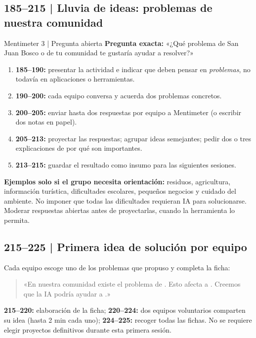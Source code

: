 \documentclass[11pt,a4paper]{article}
\begin{document}
\subsection{185--215 | Lluvia de ideas: problemas de nuestra comunidad}
\begin{actividad}{Mentimeter 3 | Pregunta abierta}
\textbf{Pregunta exacta:} «¿Qué problema de San Juan Bosco o de tu comunidad te gustaría ayudar a resolver?»
\begin{enumerate}
\item \textbf{185--190:} presentar la actividad e indicar que deben pensar en \emph{problemas}, no todavía en aplicaciones o herramientas.
\item \textbf{190--200:} cada equipo conversa y acuerda dos problemas concretos.
\item \textbf{200--205:} enviar hasta dos respuestas por equipo a Mentimeter (o escribir dos notas en papel).
\item \textbf{205--213:} proyectar las respuestas; agrupar ideas semejantes; pedir dos o tres explicaciones de por qué son importantes.
\item \textbf{213--215:} guardar el resultado como insumo para las siguientes sesiones.
\end{enumerate}
\end{actividad}
\textbf{Ejemplos solo si el grupo necesita orientación:} residuos, agricultura, información turística, dificultades escolares, pequeños negocios y cuidado del ambiente. No imponer que todas las dificultades requieran IA para solucionarse. Moderar respuestas abiertas antes de proyectarlas, cuando la herramienta lo permita.

\subsection{215--225 | Primera idea de solución por equipo}
Cada equipo escoge uno de los problemas que propuso y completa la ficha:
\begin{quote}
«En nuestra comunidad existe el problema de \underline{\hspace{3cm}}. Esto afecta a \underline{\hspace{3cm}}. Creemos que la IA podría ayudar a \underline{\hspace{3cm}}.»
\end{quote}
\textbf{215--220:} elaboración de la ficha; \textbf{220--224:} dos equipos voluntarios comparten su idea (hasta 2 min cada uno); \textbf{224--225:} recoger todas las fichas. No se requiere elegir proyectos definitivos durante esta primera sesión.
\end{document}
